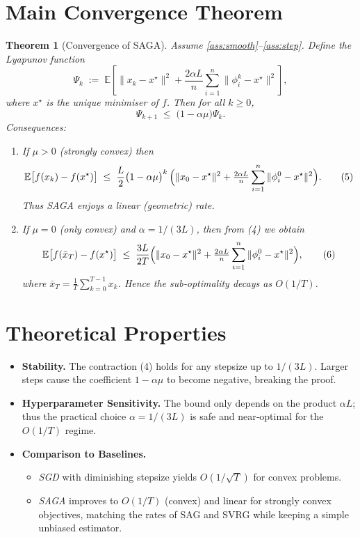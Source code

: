 \documentclass{article}
\newtheorem{theorem}{Theorem}
\begin{document}
\section*{Main Convergence Theorem}
\begin{theorem}[Convergence of SAGA]\label{thm:conv}
Assume \ref{ass:smooth}–\ref{ass:step}. Define the Lyapunov function
\[
\Psi_k \;:=\; \mathbb{E}\!\left[ \|x_k-x^\star\|^2
      +\frac{2\alpha L}{n}\sum_{i=1}^{n}\|\phi_i^k-x^\star\|^2\right],
\]
where $x^\star$ is the unique minimiser of $f$. Then for all $k\ge0$,
\begin{equation}
\Psi_{k+1}\;\le\;\bigl(1-\alpha\mu\bigr)\Psi_k . \tag{4}
\end{equation}
Consequences:
\begin{enumerate}
\item If $\mu>0$ (strongly convex) then
\[
\mathbb{E}\bigl[f(x_k)-f(x^\star)\bigr]\;\le\;
\frac{L}{2}\bigl(1-\alpha\mu\bigr)^{k}\,
\Bigl(\|x_0-x^\star\|^2+\tfrac{2\alpha L}{n}\sum_{i=1}^{n}\|\phi_i^0-x^\star\|^2\Bigr).
\tag{5}
\]
Thus SAGA enjoys a linear (geometric) rate.
\item If $\mu=0$ (only convex) and $\alpha=1/(3L)$, then from (4) we obtain
\[
\mathbb{E}\bigl[f(\bar x_T)-f(x^\star)\bigr]\;\le\;
\frac{3L}{2T}\Bigl(\|x_0-x^\star\|^2+\tfrac{2\alpha L}{n}\sum_{i=1}^{n}\|\phi_i^0-x^\star\|^2\Bigr),
\tag{6}
\]
where $\bar x_T=\tfrac1T\sum_{k=0}^{T-1}x_k$.
Hence the sub‑optimality decays as $O(1/T)$.
\end{enumerate}
\end{theorem}

\section*{Theoretical Properties}
\begin{itemize}
\item \textbf{Stability.} The contraction (4) holds for any stepsize up to $1/(3L)$. Larger steps cause the coefficient $1-\alpha\mu$ to become negative, breaking the proof.
\item \textbf{Hyperparameter Sensitivity.} The bound only depends on the product $\alpha L$; thus the practical choice $\alpha=1/(3L)$ is safe and near‑optimal for the $O(1/T)$ regime.
\item \textbf{Comparison to Baselines.}
\begin{itemize}
\item \emph{SGD} with diminishing stepsize yields $O(1/\sqrt{T})$ for convex problems.
\item \emph{SAGA} improves to $O(1/T)$ (convex) and linear for strongly convex objectives, matching the rates of SAG and SVRG while keeping a simple unbiased estimator.
\end{itemize}
\end{itemize}
\end{document}

